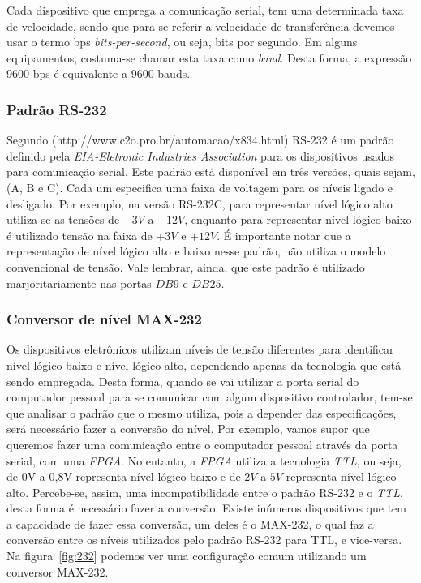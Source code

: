 \documentclass[12pt]{article}
\begin{document}
Cada dispositivo que emprega a comunicação serial, tem uma determinada taxa de velocidade, sendo que para se referir a velocidade de transferência devemos usar o termo bps \textit{bits-per-second}, ou seja, bits por segundo. Em alguns equipamentos, costuma-se chamar esta taxa  como \textit{baud}. Desta forma, a expressão 9600 bps é equivalente a 9600 bauds.

\subsubsection{Padrão RS-232}
Segundo (http://www.c2o.pro.br/automacao/x834.html) RS-232 é um padrão definido pela \textit{EIA-Eletronic Industries Association} para os dispositivos usados para comunicação serial. Este padrão está disponível em três versões, quais sejam, (A, B e C). Cada um especifica uma faixa de voltagem para os níveis ligado e desligado. Por exemplo, na versão RS-232C, para representar  nível lógico alto utiliza-se as tensões de $-3V$ a $-12V$, enquanto para representar nível lógico baixo é utilizado tensão na faixa de $+3V$ e $+12V$. É importante notar que a representação de nível lógico alto e baixo nesse padrão, não utiliza o modelo convencional de tensão. Vale lembrar, ainda, que este padrão é utilizado marjoritariamente nas portas $DB9$ e $DB25$.  

\subsubsection{Conversor de nível MAX-232}
Os dispositivos eletrônicos utilizam níveis de tensão diferentes para identificar nível lógico baixo e nível lógico alto, dependendo apenas da tecnologia que está sendo empregada. Desta forma, quando se vai utilizar a porta serial do computador pessoal para se comunicar com algum dispositivo controlador, tem-se que analisar o padrão que o mesmo utiliza, pois a depender das especificações, será necessário fazer a conversão do nível. Por exemplo, vamos supor que queremos fazer uma comunicação entre o computador pessoal através da porta serial, com uma \textit{FPGA}. No entanto, a \textit{FPGA} utiliza a tecnologia \textit{TTL}, ou seja, de 0V a 0,8V representa nível lógico baixo e de $2V$ a $5V$ representa nível lógico alto. Percebe-se, assim, uma incompatibilidade entre o padrão RS-232 e o \textit{TTL}, desta forma é necessário fazer a conversão. Existe inúmeros dispositivos que tem a capacidade de fazer essa conversão, um deles é o MAX-232, o qual faz  a conversão entre os níveis utilizados pelo padrão RS-232 para TTL, e vice-versa. Na figura~\ref{fig:232} podemos ver uma configuração comum utilizando um conversor MAX-232. 
\end{document}
